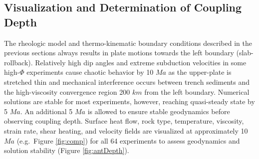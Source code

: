 \hypertarget{visualization-and-determination-of-coupling-depth}{%
\subsection{Visualization and Determination of Coupling Depth}\label{visualization-and-determination-of-coupling-depth}}

The rheologic model and thermo-kinematic boundary conditions described in the previous sections always results in plate motions towards the left boundary (slab-rollback). Relatively high dip angles and extreme subduction velocities in some high-\(\Phi\) experiments cause chaotic behavior by 10 \(Ma\) as the upper-plate is stretched thin and mechanical interference occurs between trench sediments and the high-viscosity convergence region 200 \(km\) from the left boundary. Numerical solutions are stable for most experiments, however, reaching quasi-steady state by 5 \(Ma\). An additional 5 \(Ma\) is allowed to ensure stable geodynamics before observing coupling depth. Surface heat flow, rock type, temperature, viscosity, strain rate, shear heating, and velocity fields are visualized at approximately 10 \(Ma\) (e.g.~Figure \ref{fig:comp}) for all 64 experiments to assess geodynamics and solution stability (Figure \ref{fig:antDepth}).

